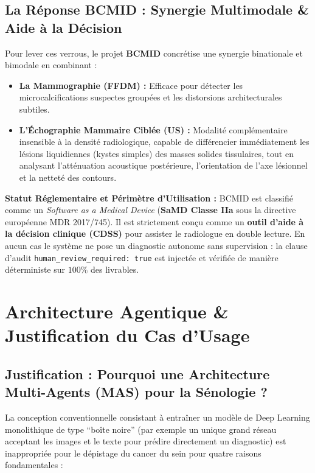 \documentclass[11pt,a4paper]{article}
\begin{document}
\subsection{La Réponse BCMID : Synergie Multimodale \& Aide à la Décision}
Pour lever ces verrous, le projet \textbf{BCMID} concr\'etise une synergie binationale et bimodale en combinant :
\begin{itemize}
    \item \textbf{La Mammographie (FFDM) :} Efficace pour d\'etecter les microcalcifications suspectes group\'ees et les distorsions architecturales subtiles.
    \item \textbf{L'Échographie Mammaire Ciblée (US) :} Modalit\'e compl\'ementaire insensible \`a la densit\'e radiologique, capable de diff\'erencier imm\'ediatement les l\'esions liquidiennes (kystes simples) des masses solides tissulaires, tout en analysant l'att\'enuation acoustique post\'erieure, l'orientation de l'axe l\'esionnel et la nettet\'e des contours.
\end{itemize}

\begin{clinicalalert}
\textbf{Statut Réglementaire et Périmètre d'Utilisation :} BCMID est classifi\'e comme un \textit{Software as a Medical Device} (\textbf{SaMD Classe IIa} sous la directive europ\'eenne MDR 2017/745). Il est strictement con\c{c}u comme un \textbf{outil d'aide \`a la d\'ecision clinique (CDSS)} pour assister le radiologue en double lecture. En aucun cas le syst\`eme ne pose un diagnostic autonome sans supervision : la clause d'audit \texttt{human\_review\_required: true} est inject\'ee et v\'erifi\'ee de mani\`ere d\'eterministe sur $100\%$ des livrables.
\end{clinicalalert}

\section{Architecture Agentique \& Justification du Cas d'Usage}
\label{sec:agent_architecture}

\subsection{Justification : Pourquoi une Architecture Multi-Agents (MAS) pour la Sénologie ?}
La conception conventionnelle consistant \`a entra\^iner un mod\`ele de Deep Learning monolithique de type ``bo\^ite noire'' (par exemple un unique grand r\'eseau acceptant les images et le texte pour pr\'edire directement un diagnostic) est inappropri\'ee pour le d\'epistage du cancer du sein pour quatre raisons fondamentales :
\end{document}
